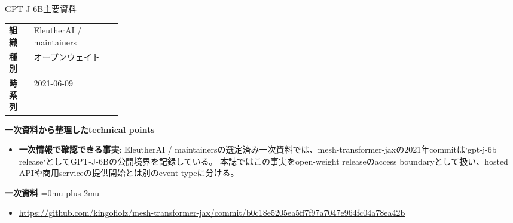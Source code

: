 \begin{technicalnote}{GPT-J-6B}{主要資料}
\begingroup
\begin{tabularx}{\linewidth}{@{}>{\bfseries}p{0.22\linewidth}X@{}}
組織 & EleutherAI / maintainers \\
種別 & オープンウェイト \\
時系列 & 2021-06-09 \\
\end{tabularx}
\smallskip
\begin{minipage}{\linewidth}
{\bfseries 一次資料から整理したtechnical points}
\begin{itemize}[leftmargin=1.5em,itemsep=0.35em]
\item \textbf{一次情報で確認できる事実}: EleutherAI / maintainersの選定済み一次資料では、mesh-transformer-jaxの2021年commitは`gpt-j-6b release`としてGPT-J-6Bの公開境界を記録している。 本誌ではこの事実をopen-weight releaseのaccess boundaryとして扱い、hosted APIや商用serviceの提供開始とは別のevent typeに分ける。
\end{itemize}
\begin{minipage}{\linewidth}
\begin{samepage}
{\bfseries 一次資料}
\begingroup\sloppy
\Urlmuskip=0mu plus 2mu\relax
\begin{itemize}[leftmargin=1.5em,itemsep=0.25em]
\item {\scriptsize\url{https://github.com/kingoflolz/mesh-transformer-jax/commit/b0c18e5205ea5ff7f97a7047e964fc04a78ea42b}}
\end{itemize}
\endgroup
\end{samepage}
\end{minipage}
\end{minipage}
\endgroup
\end{technicalnote}
\medskip

